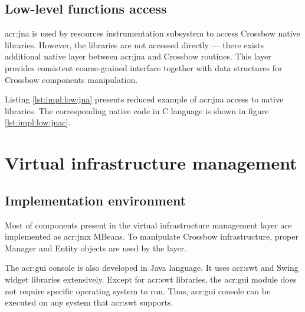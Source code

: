 \documentclass[11pt,openany]{book}
\begin{document}
      \subsection{Low-level functions access}
      \label{sec:impl:low}

        \gls{acr:jna} is used by resources instrumentation subsystem to access Crossbow native libraries. However, the
        libraries are not accessed directly --- there exists additional native layer between \gls{acr:jna} and Crossbow
        routines. This layer provides consistent coarse-grained interface together with data structures for Crossbow
        components manipulation.

        Listing \ref{lst:impl:low:jna} presents reduced example of \gls{acr:jna} access to native libraries. The
        corresponding native code in C language is shown in figure \ref{lst:impl:low:jnac}. \\

        \noindent
          \begin{minipage}{\textwidth}
          
        \end{minipage}  

        \noindent
        \begin{minipage}{\textwidth}
          
        \end{minipage}


    \section{Virtual infrastructure management}

      \subsection{Implementation environment}

        Most of components present in the virtual infrastructure management layer are implemented as \gls{acr:jmx}
        MBeans. To manipulate Crossbow infrastructure, proper Manager and Entity objects are used by the layer.

        The \gls{acr:gui} console is also developed in Java language. It uses \gls{acr:swt} and Swing widget libraries
        extensively. Except for \gls{acr:swt} libraries, the \gls{acr:gui} module does not require specific operating
        system to run. Thus, \gls{acr:gui} console can be executed on any system that \gls{acr:swt} supports.
\end{document}
